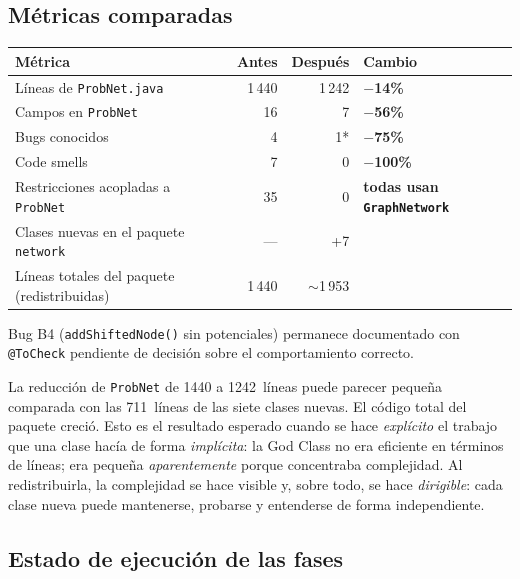 \documentclass[11pt,a4paper]{article}
\newcommand{\code}[1]{\texttt{#1}}
\newcommand{\good}[1]{\textcolor{codegreen}{\textbf{#1}}}
\begin{document}
\subsection{Métricas comparadas}

\begin{center}
\begin{tabular}{lrrl}
\toprule
\textbf{Métrica} & \textbf{Antes} & \textbf{Después} & \textbf{Cambio} \\
\midrule
Líneas de \code{ProbNet.java}               & 1\,440 & 1\,242 & \good{$-$14\%} \\
Campos en \code{ProbNet}                    & 16     & 7      & \good{$-$56\%} \\
Bugs conocidos                              & 4      & 1*     & \good{$-$75\%} \\
Code smells                                 & 7      & 0      & \good{$-$100\%} \\
Restricciones acopladas a \code{ProbNet}    & 35     & 0      & \good{todas usan \code{GraphNetwork}} \\
Clases nuevas en el paquete \code{network}  & ---    & +7     & \\
Líneas totales del paquete (redistribuidas) & 1\,440 & $\sim$1\,953 & \\
\bottomrule
\end{tabular}
\end{center}

{\small * Bug B4 (\code{addShiftedNode()} sin potenciales) permanece documentado
con \code{@ToCheck} pendiente de decisión sobre el comportamiento correcto.}

La reducción de \code{ProbNet} de 1440 a 1242~líneas puede parecer pequeña
comparada con las 711~líneas de las siete clases nuevas.  El código total
del paquete creció.  Esto es el resultado esperado cuando se hace
\emph{explícito} el trabajo que una clase hacía de forma \emph{implícita}:
la God Class no era eficiente en términos de líneas; era pequeña
\emph{aparentemente} porque concentraba complejidad.  Al redistribuirla,
la complejidad se hace visible y, sobre todo, se hace \emph{dirigible}:
cada clase nueva puede mantenerse, probarse y entenderse de forma
independiente.

\subsection{Estado de ejecución de las fases}
\end{document}
